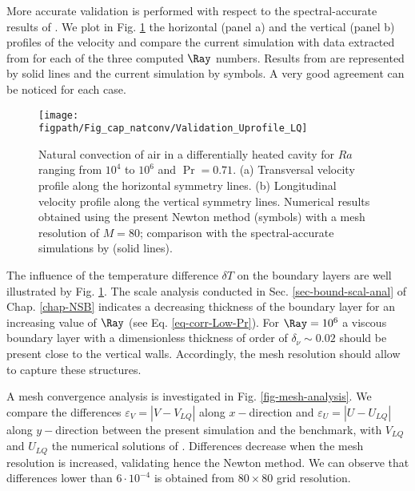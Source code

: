 More accurate validation is performed with respect to the spectral-accurate results of \cite{LeQuere91}.
We plot in Fig. \ref{fig-T1-prof} the horizontal (panel a) and the vertical (panel b)  profiles of the velocity and compare the current simulation with data extracted from  \cite{LeQuere91} for each of the three computed $\Ray$ numbers.
Results from \cite{LeQuere91} are represented by solid lines and the current simulation by symbols.
A very good agreement can  be noticed for each case.

\begin{figure}
	\begin{center}
		\texttt{[image: \\figpath/Fig\_cap\_natconv/Validation\_Uprofile\_LQ]} 
	\end{center}
	\caption{Natural convection of air in a differentially heated cavity for $Ra$ ranging from $10^4$ to $10^6$ and $\Pr = 0.71$. (a) Transversal velocity profile along the  horizontal symmetry lines. (b) Longitudinal velocity profile along the vertical symmetry lines. Numerical results obtained using the present Newton method (symbols) with a mesh resolution of $M=80$; comparison with the spectral-accurate simulations by \cite{LeQuere91} (solid lines).}
	\label{fig-T1-prof}
\end{figure}

The influence of the temperature difference $\delta T$ on the boundary layers are well illustrated by Fig.  \ref{fig-T1-prof}.
The scale analysis conducted in Sec. \ref{sec-bound-scal-anal} of Chap. \ref{chap-NSB} indicates a decreasing thickness of the boundary layer for an increasing value of $\Ray$ (see Eq. \ref{eq-corr-Low-Pr}). 
For $\Ray = 10^6$ a viscous boundary layer with a dimensionless thickness of order of $\delta_\nu \sim 0.02$ should be present close to the vertical walls.
Accordingly, the mesh resolution should allow to capture these structures.

\noindent A mesh convergence analysis is investigated in Fig. \ref{fig-mesh-analysis}. 
We compare the differences $\varepsilon_V = |V - V_{LQ}|$ along $x-$direction  and $\varepsilon_U = |U - U_{LQ}|$ along $y-$direction between the present simulation and the benchmark, with $V_{LQ}$ and $U_{LQ}$ the numerical solutions of   \cite{LeQuere91}.
Differences decrease when the mesh resolution is increased, validating hence the Newton method.
We can observe that differences lower than $6 \cdot 10^{-4}$ is obtained from $80 \times 80$ grid resolution.

